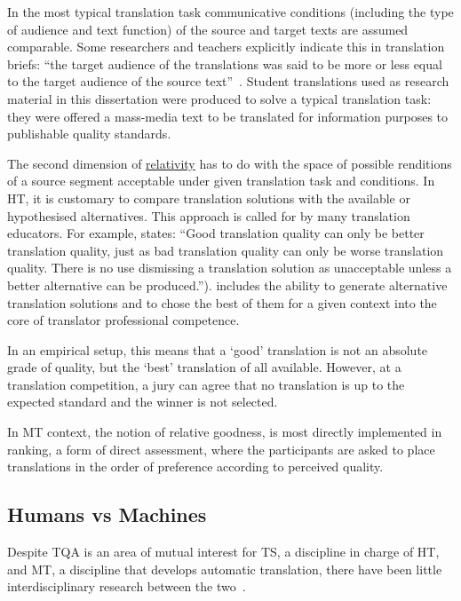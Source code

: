 In the most typical translation task communicative conditions (including the type of audience and text function) of the source and target texts are assumed comparable. Some researchers and teachers explicitly indicate this in translation briefs: ``the target audience of the translations was said to be more or less equal to the target audience of the source text''~\cite{Daems2013}. Student translations used as research material in this dissertation were produced to solve a typical translation task: they were offered a mass-media text to be translated for information purposes to publishable quality standards.

The second dimension of \hyperlink{wd:relativity}{relativity} has to do with the space of possible renditions of a source segment acceptable under given translation task and conditions. In HT, it is customary to compare translation solutions with the available or hypothesised alternatives. 
This approach is called for by many translation educators. For example, \citet[p.172]{Bittner2020} states: ``Good translation quality can only be better translation quality, just as bad translation quality can only be worse translation quality. There is no use dismissing a translation solution as unacceptable unless a better alternative can be produced.''). \citet{Pym2003} includes the ability to generate alternative translation solutions and to chose the best of them for a given context into the core of translator professional competence. 

In an empirical setup, this means that a `good' translation is not an absolute grade of quality, but the `best' translation of all available. However, at a translation competition, a jury can agree that no translation is up to the expected standard and the winner is not selected.

In MT context, the notion of relative goodness, is most directly implemented in ranking, a form of direct assessment, where the participants are asked to place translations in the order of preference according to perceived quality.

\subsection{\label{ssec:versus}Humans vs Machines}
Despite \gls{TQA} is an area of mutual interest for TS, a discipline in charge of HT, and MT, a discipline that develops automatic translation, there have been little interdisciplinary research between the two~\cite{Ahrenberg2017}. 


